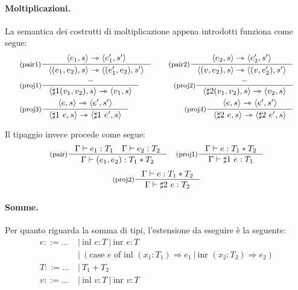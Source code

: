 \documentclass[a4paper, 11pt]{article}
\newcommand{\type}{\Gamma \vdash}
\newcommand{\goesto}{\rightarrowtriangle}
\begin{document}
\paragraph{Moltiplicazioni.}
La semantica dei costrutti di moltiplicazione appena introdotti funziona come segue: \begin{align*}
	&\inference[(pair1)]{\langle e_1,s \rangle \goesto \langle e_1',s' \rangle}{\langle (e_1, e_2),s \rangle \goesto \langle (e_1', e_2), s' \rangle} \quad &\inference[(pair2)]{\langle e_2,s \rangle \goesto \langle e_2',s' \rangle}{\langle (v, e_2),s \rangle \goesto \langle (v, e_2'), s' \rangle} \\
	&\inference[(proj1)]{-}{\langle \sharp 1 (v_1, v_2),s \rangle \goesto \langle v_1, s \rangle} \quad &\inference[(proj2)]{-}{\langle \sharp 2 (v_1, v_2),s \rangle \goesto \langle v_2, s \rangle} \\
	&\inference[(proj3)]{\langle e,s \rangle \goesto \langle e',s' \rangle}{\langle \sharp 1\ e, s \rangle \goesto \langle \sharp 1\ e', s \rangle} \quad &\inference[(proj4)]{\langle e,s \rangle \goesto \langle e',s' \rangle}{\langle \sharp 2\ e, s \rangle \goesto \langle \sharp 2\ e', s \rangle}
\end{align*}

Il tipaggio invece procede come segue: 
\[
	\inference[(pair)]{\type e_1:T_1 \quad \type e_2:T_2}{\type (e_1, e_2): T_1 * T_2} \quad \inference[(proj1)]{\type e:T_1*T_2}{\type \sharp 1\ e:T_1} \] \[ \inference[(proj2)]{\type e:T_1*T_2}{\type \sharp 2\ e:T_2} 
\]

\paragraph{Somme.}
Per quanto riguarda la somma di tipi, l'estensione da eseguire è la seguente: \begin{align*}
	e ::= \dots\ &|\ \text{inl } e:T\ |\ \text{inr } e:T\\ &|\ (\text{case } e \text{ of inl }(x_1:T_1) \Rightarrow e_1\ |\ \text{inr } (x_2:T_2) \Rightarrow e_2) \\
	T ::= \dots\ &|\ T_1 + T_2 \\
	v ::= \dots &|\ \text{inl }v:T\ |\ \text{inr }v:T
\end{align*}
\end{document}
